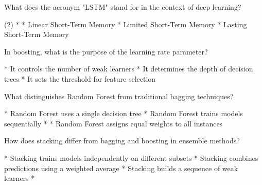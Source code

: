 \documentclass[11pt]{extarticle}
\begin{document}
\begin{exercise}
    What does the acronym "LSTM" stand for in the context of deep learning?
    \begin{choice}(2)
        * 
        * Linear Short-Term Memory
        * Limited Short-Term Memory
        * Lasting Short-Term Memory
    \end{choice}
\end{exercise}
\begin{solution}
\end{solution}

\begin{exercise}
    In boosting, what is the purpose of the learning rate parameter?
    \begin{choice}
        * It controls the number of weak learners
        * It determines the depth of decision trees
        * It sets the threshold for feature selection
    \end{choice}
\end{exercise}
\begin{solution}
\end{solution}

\begin{exercise}
    What distinguishes Random Forest from traditional bagging techniques?
    \begin{choice}
        * Random Forest uses a single decision tree
        * Random Forest trains models sequentially
        * 
        * Random Forest assigns equal weights to all instances
    \end{choice}
\end{exercise}
\begin{solution}
\end{solution}

\begin{exercise}
    How does stacking differ from bagging and boosting in ensemble methods?
    \begin{choice}
        * Stacking trains models independently on different subsets
        * Stacking combines predictions using a weighted average
        * Stacking builds a sequence of weak learners
        * 
    \end{choice}
\end{exercise}
\begin{solution}
\end{solution}
\end{document}
